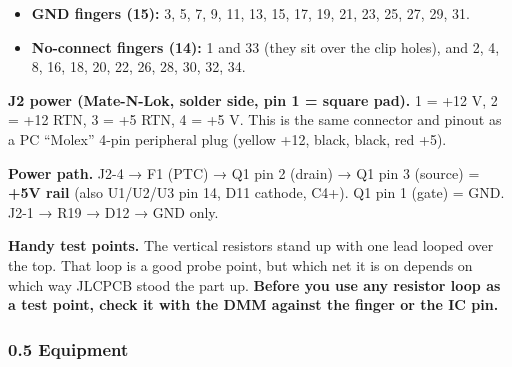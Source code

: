 \documentclass[
  10pt,
  twoside]{article}
\providecommand{\tightlist}{%
  \setlength{\itemsep}{0pt}\setlength{\parskip}{0pt}}
\begin{document}
\begin{itemize}
\tightlist
\item
  \textbf{GND fingers (15):} 3, 5, 7, 9, 11, 13, 15, 17, 19,
  21, 23, 25, 27, 29, 31.
\item
  \textbf{No-connect fingers (14):} 1 and 33 (they sit over
  the clip holes), and 2, 4, 8, 16, 18, 20, 22, 26, 28, 30,
  32, 34.
\end{itemize}

\textbf{J2 power (Mate-N-Lok, solder side, pin 1 = square
pad).} 1 = +12 V, 2 = +12 RTN, 3 = +5 RTN, 4 = +5 V. This is
the same connector and pinout as a PC ``Molex'' 4-pin
peripheral plug (yellow +12, black, black, red +5).

\textbf{Power path.} J2-4 → F1 (PTC) → Q1 pin 2 (drain) → Q1
pin 3 (source) = \textbf{+5V rail} (also U1/U2/U3 pin 14,
D11 cathode, C4+). Q1 pin 1 (gate) = GND. J2-1 → R19 → D12 →
GND only.

\textbf{Handy test points.} The vertical resistors stand up
with one lead looped over the top. That loop is a good probe
point, but which net it is on depends on which way JLCPCB
stood the part up. \textbf{Before you use any resistor loop
as a test point, check it with the DMM against the finger or
the IC pin.}

\hypertarget{equipment}{%
\subsubsection{0.5 Equipment}\label{equipment}}
\end{document}

